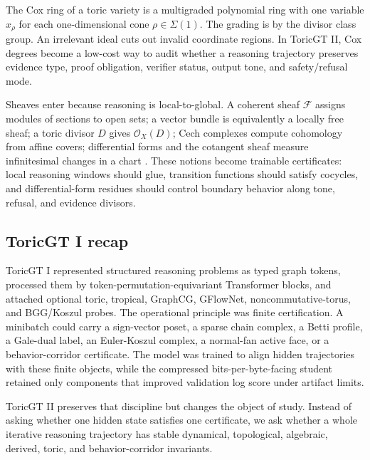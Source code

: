 \documentclass[10pt]{article}
\newcommand{\calF}{\mathcal{F}}
\newcommand{\calO}{\mathcal{O}}
\numberwithin{equation}{section}
\begin{document}
The Cox ring of a toric variety is a multigraded polynomial ring with one variable $x_\rho$ for each one-dimensional cone $\rho\in\Sigma(1)$. The grading is by the divisor class group. An irrelevant ideal cuts out invalid coordinate regions. In ToricGT II, Cox degrees become a low-cost way to audit whether a reasoning trajectory preserves evidence type, proof obligation, verifier status, output tone, and safety/refusal mode.

Sheaves enter because reasoning is local-to-global. A coherent sheaf $\calF$ assigns modules of sections to open sets; a vector bundle is equivalently a locally free sheaf; a toric divisor $D$ gives $\calO_X(D)$; Cech complexes compute cohomology from affine covers; differential forms and the cotangent sheaf measure infinitesimal changes in a chart \cite{cls,hartshorne}. These notions become trainable certificates: local reasoning windows should glue, transition functions should satisfy cocycles, and differential-form residues should control boundary behavior along tone, refusal, and evidence divisors.

\subsection{ToricGT I recap}
ToricGT I represented structured reasoning problems as typed graph tokens, processed them by token-permutation-equivariant Transformer blocks, and attached optional toric, tropical, GraphCG, GFlowNet, noncommutative-torus, and BGG/Koszul probes. The operational principle was finite certification. A minibatch could carry a sign-vector poset, a sparse chain complex, a Betti profile, a Gale-dual label, an Euler-Koszul complex, a normal-fan active face, or a behavior-corridor certificate. The model was trained to align hidden trajectories with these finite objects, while the compressed bits-per-byte-facing student retained only components that improved validation log score under artifact limits.

ToricGT II preserves that discipline but changes the object of study. Instead of asking whether one hidden state satisfies one certificate, we ask whether a whole iterative reasoning trajectory has stable dynamical, topological, algebraic, derived, toric, and behavior-corridor invariants.
\end{document}
